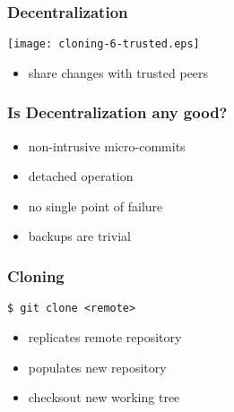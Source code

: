 \documentclass[english]{beamer}
\newcommand{\CMD}[1]{%
\texttt{\textcolor{code-blue}{#1}}%
}
\newcommand{\green}[1]{%
\textcolor{code-green}{#1}%
}
\begin{document}
\begin{frame}
\frametitle{Decentralization}
\texttt{[image: cloning-6-trusted.eps]}
\begin{itemize}
        \item share changes with trusted peers
\end{itemize}
\end{frame}

\begin{frame}
\frametitle{Is Decentralization any good?}

\begin{itemize}
        \item non-intrusive micro-commits
        \item detached operation
        \item no single point of failure
        \item backups are trivial
\end{itemize}
\end{frame}

\begin{frame}
\frametitle{Cloning}

\CMD{\$ git clone <remote>} \\
\begin{itemize}
        \item replicates \green{remote} repository
        \item populates new repository
        \item checksout new working tree
\end{itemize}
\end{frame}
\end{document}
